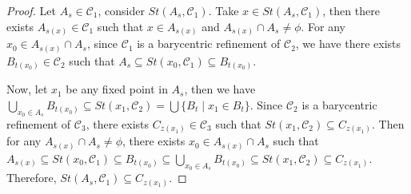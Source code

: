 \documentclass[12pt,oneside,english]{amsbook}
\numberwithin{equation}{section} %
\numberwithin{figure}{section} %
\theoremstyle{plain}
\numberwithin{section}{chapter}
\theoremstyle{plain}
\begin{document}
\begin{proof}
  Let $A_{s} \in \mathcal{C}_1$, consider $St(A_{s}, \mathcal{C}_1)$. Take $x \in St(A_{s},\mathcal{C}_1)$, then there exists $A_{s(x)} \in \mathcal{C}_1$ such that $x \in A_{s(x)}$ and $A_{s(x)} \cap A_{s} \neq \phi$. For any $x_{0} \in A_{s(x)} \cap A_{s}$, since $\mathcal{C}_1$ is a barycentric refinement of $\mathcal{C}_2$, we have there exists $B_{t(x_{0})} \in \mathcal{C}_2$ such that $A_s \subseteq St(x_{0}, \mathcal{C}_1) \subseteq B_{t(x_{0})}$. %

  Now, let $x_{1}$ be any fixed point in $A_{s}$, then we have $\bigcup_{x_{0} \in A_{s}}B_{t(x_{0})} \subseteq St(x_{1}, \mathcal{C}_2) = \bigcup \{B_{t} \; | \; x_{1} \in B_{t} \}$. Since $\mathcal{C}_2$ is a barycentric refinement of $\mathcal{C}_3$, there exists $C_{z(x_{1})} \in \mathcal{C}_3$ such that $St(x_{1},\mathcal{C}_2) \subseteq C_{z(x_{1})}$. Then for any $A_{s(x)} \cap A_{s} \neq \phi$, there exists $x_{0} \in A_{s(x)} \cap A_{s}$ such that $A_{s(x)} \subseteq St(x_{0}, \mathcal{C}_1) \subseteq B_{t(x_{0})} \subseteq \bigcup_{x_{0} \in A_{s}}B_{t(x_{0})} \subseteq St(x_{1}, \mathcal{C}_2) \subseteq C_{z(x_{1})}$. Therefore, $St(A_{s},\mathcal{C}_1) \subseteq C_{z(x_{1})}$.
\end{proof}
\end{document}
